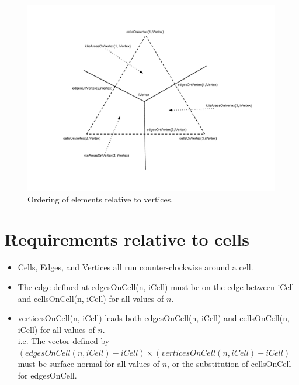 \documentclass[11pt]{report}
\begin{document}
\begin{figure}
	\centering
	\includegraphics[scale=0.4]{figures/Vertex Diagram.pdf}
	\caption{Ordering of elements relative to vertices.}
\end{figure}

\section{Requirements relative to cells}

\begin{itemize}
	\item Cells, Edges, and Vertices all run counter-clockwise around a cell.
	\item The edge defined at edgesOnCell(n, iCell) must be on the edge between iCell and cellsOnCell(n, iCell) for all values of $n$.
	\item verticesOnCell(n, iCell) leads both edgesOnCell(n, iCell) and cellsOnCell(n, iCell) for all values of $n$. \\
		  i.e. The vector defined by \\
		  {\small $(edgesOnCell(n, iCell) - iCell) \times (verticesOnCell(n, iCell) - iCell)$} \\
		  must be surface normal for all values of $n$, or the substitution of cellsOnCell for edgesOnCell.
\end{itemize}
\end{document}
